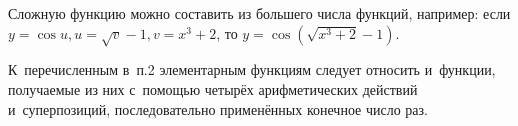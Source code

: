 \begin{Note}
Сложную функцию можно составить из большего числа функций, например:
если $y = \cos u, u = \sqrt{v}-1, v = x^{3}+2$,
то $y = \cos (\sqrt{x^{3}+2} - 1)$.
\end{Note}

\begin{Note}
К~перечисленным в~п.2 элементарным функциям следует относить и~функции,
получаемые из них с~помощью четырёх арифметических действий и~суперпозиций,
последовательно применённых конечное число раз.
\end{Note}

